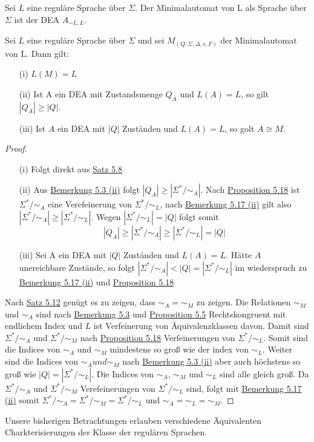  Sei $L$ eine reguläre Sprache über $\Sigma$. Der Minimalautomat von L als Sprache über $\Sigma$ ist der DEA $A_{\sim L, L}$.

Sei $L$ eine reguläre Sprache über $\Sigma$ und sei $M _ (Q, \Sigma, \Delta, s ,F)$ der Minimalautomat von L. Dann gilt:
\begin{itemize}
  \item [(i)] $L(M) = L$
  \item [(ii)] Ist A ein DEA mit Zustandsmenge $Q_A$ und $L(A) = L$, so gilt $|Q_A| \geq |Q|$.
  \item [(iii)] Ist $A$ ein DEA mit $|Q|$ Zuständen und $L(A) = L$, so golt $A \cong M$.
\end{itemize}
\begin{proof}
  \begin{itemize}
    \item [(i)] Folgt direkt aus \hyperref[subsec:5.8]{Satz 5.8} 
    \item [(ii)] Aus \hyperref[subsec:5.3]{Bemerkung 5.3 (ii)} folgt $|Q_A| \geq |\Sigma^* / \sim_A|$. Nach \hyperref[subsec:5.18]{Proposition 5.18} ist $\Sigma^* / \sim_A$ eine Verefeinerung von $\Sigma^* / \sim_L$, nach \hyperref[subsec:5.17]{Bemerkung 5.17 (ii)} gilt also $|\Sigma^* / \sim_A| \geq |\Sigma^* / \sim_L|$. Wegen $|\Sigma^* / \sim_L| = |Q|$ folgt somit \[|Q_A| \geq |\Sigma^* / \sim_A| \geq |\Sigma^* / \sim_L| = |Q|\]
    \item [(iii)] Sei A ein DEA mit $|Q|$ Zuständen und $L(A) = L$. Hätte $A$ unereichbare Zustände, so folgt $|\Sigma^* / \sim_A| < |Q| = |\Sigma^* /\sim_L|$ im wiederspruch zu \hyperref[subsec:5.17]{Bemerkung 5.17 (ii)} und \hyperref[subsec:5.18]{Proposition 5.18} 
  \end{itemize}
  Nach \hyperref[subsec:5.12]{Satz 5.12} genügt es zu zeigen, dass $\sim_A = \sim_M$ zu zeigen. Die Relationen $\sim_M$ und $\sim_A$ sind nach \hyperref[subsec:5.3]{Bemerkung 5.3} und \hyperref[subsec:5.5]{Proposition 5.5} Rechtskongruent mit endlichem Index und $L$ ist Verfeinerung von Äquivalenzklassen davon. Damit sind $\Sigma^* / \sim_A$ und $\Sigma^* / \sim_M$ nach \hyperref[subsec:5.18]{Proposition 5.18} Verfeinerungen von $\Sigma^* /\sim_L$. Somit sind die Indices von $\sim_A$ und $\sim_M$ mindestens so groß wie der index von $\sim_L$. Weiter sind die Indices von $\sim_A und \sim_M$ nach \hyperref[subsec:5.3]{Bemerkung 5.3 (ii)} aber auch höchstens so groß wie $|Q| = |\Sigma^* / \sim_L|$. Die Indices von $\sim_A$, $\sim_M$ und $\sim_L$ sind alle gleich groß. Da $\Sigma^* / \sim_A$ und $\Sigma^* / \sim_M$ Verefeinerungen von $\Sigma^* /\sim_L$ sind, folgt mit \hyperref[subsec:5.17]{Bemerkung 5.17 (ii)} somit $\Sigma^* /\sim_A = \Sigma^* /\sim_M = \Sigma^* /\sim_L$ und $\sim_A = \sim_L = \sim_M$. 
\end{proof}
Unsere bisherigen Betrachtungen erlauben verschiedene Äquivalenten Charkterisierungen der Klasse der regulären Sprachen.

